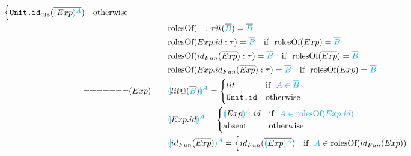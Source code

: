 \documentclass[11pt]{jarticle}
\newcommand{\projection}[2]{{\color{cyan}\llparenthesis}#1{\color{cyan}\rrparenthesis^#2}}
\newcommand{\projection}[2]{{\color{cyan}\llparenthesis}#1{\color{cyan}\rrparenthesis^#2}}
\begin{document}
\begin{alignat*}{2}
\begin{cases}
    \texttt{Unit.id}_\texttt{Cls}(\overline{\projection{Exp}{A}}) &\text{otherwise}
  \end{cases}\\
  &&&\text{rolesOf}(\_:\tau@(\overline{\color{cyan}B}) = {\overline{\color{cyan}B}}\\
  &&&\text{rolesOf}(Exp.id:\tau) = \overline{\color{cyan}B} ~~~\text{if}~~ \text{rolesOf}(Exp)=\overline{\color{cyan}B}\\
  &&&\text{rolesOf}(id_{Fun}(\overline{Exp}):\tau) = \overline{\color{cyan}B}~~~\text{if}~~\text{rolesOf}(\overline{Exp})=\overline{\color{cyan}B}\\
  &&&\text{rolesOf}(Exp.id_{Fun}(\overline{Exp}):\tau) = \overline{\color{cyan}B}~~~\text{if}~~\text{rolesOf}(Exp)=\overline{\color{cyan}B}\\
=======
  &(Exp)~~~ &&\projection{lit@(\overline{\color{cyan}{B}})}{A}=
  \begin{cases}
    lit & \text{if}~~ \color{cyan}{A}\in \overline{\color{cyan}{B}}\\
    \texttt{Unit.id} &\text{otherwise}
  \end{cases}\\
  &&&\projection{Exp.id}{A}= 
  \begin{cases}
    \projection{Exp}{A}.id &\text{if}~~\color{cyan}{A} \in \text{rolesOf} (Exp.id)\\
    \text{absent} &\text{otherwise}
  \end{cases}\\
  &&&\projection{id_{Fun}(\overline{Exp})}{A}=
  \begin{cases}
    id_{Fun}(\overline{\projection{Exp}{A}}) &\color{black}\text{if}~~ \color{cyan}A \color{black} \in \text{rolesOf} (id_{Fun}(\overline{Exp}))\\

\end{cases}
\end{alignat*}
\end{document}
